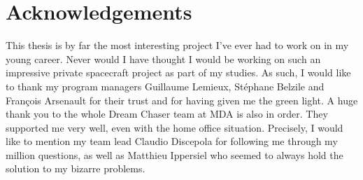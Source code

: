 \chapter*{Acknowledgements}\label{cha:ack}
This thesis is by far the most interesting project I've ever had to work on in my young career. Never would I have thought I would be working on such an impressive private spacecraft project as part of my studies. As such, I would like to thank my program managers Guillaume Lemieux, Stéphane Belzile and François Arsenault for their trust and for having given me the green light. A huge thank you  to the whole Dream Chaser team at MDA is also in order. They supported me very well, even with the home office situation. Precisely, I would like to mention my team lead Claudio Discepola for following me through my million questions, as well as Matthieu Ippersiel who seemed to always hold the solution to my bizarre problems.